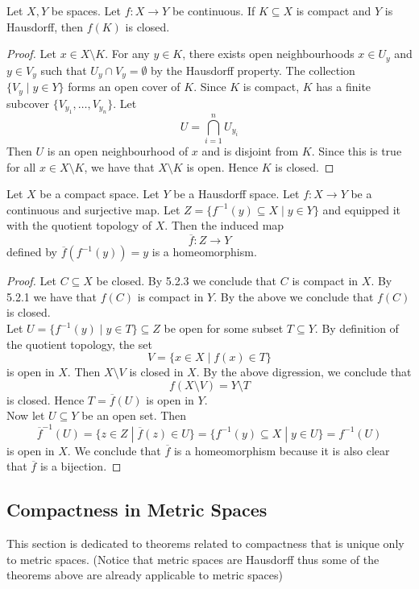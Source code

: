 \documentclass[a4paper]{article}
\begin{document}
\begin{prp}{}{} Let $X,Y$ be spaces. Let $f:X\to Y$ be continuous. If $K\subseteq X$ is compact and $Y$ is Hausdorff, then $f(K)$ is closed. 
\begin{proof}
Let $x\in X\setminus K$. For any $y\in K$, there exists open neighbourhoods $x\in U_y$ and $y\in V_y$ such that $U_y\cap V_y=\emptyset$ by the Hausdorff property. The collection $\{V_y\;|\;y\in Y\}$ forms an open cover of $K$. Since $K$ is compact, $K$ has a finite subcover $\{V_{y_1},\dots,V_{y_n}\}$. Let $$U=\bigcap_{i=1}^nU_{y_i}$$ Then $U$ is an open neighbourhood of $x$ and is disjoint from $K$. Since this is true for all $x\in X\setminus K$, we have that $X\setminus K$ is open. Hence $K$ is closed. 
\end{proof}
\end{prp}

\begin{prp}{}{} Let $X$ be a compact space. Let $Y$ be a Hausdorff space. Let $f:X\to Y$ be a continuous and surjective map. Let $Z=\{f^{-1}(y)\subseteq X\;|\;y\in Y\}$ and equipped it with the quotient topology of $X$. Then the induced map $$\overline{f}:Z\to Y$$ defined by $\overline{f}(f^{-1}(y))=y$ is a homeomorphism. 
\begin{proof}
Let $C\subseteq X$ be closed. By 5.2.3 we conclude that $C$ is compact in $X$. By 5.2.1 we have that $f(C)$ is compact in $Y$. By the above we conclude that $f(C)$ is closed. \\

Let $U=\{f^{-1}(y)\;|\; y\in T\}\subseteq Z$ be open for some subset $T\subseteq Y$. By definition of the quotient topology, the set $$V=\{x\in X\;|\;f(x)\in T\}$$ is open in $X$. Then $X\setminus V$ is closed in $X$. By the above digression, we conclude that $$f(X\setminus V)=Y\setminus T$$ is closed. Hence $T=\overline{f}(U)$ is open in $Y$. \\

Now let $U\subseteq Y$ be an open set. Then $$\overline{f}^{-1}(U)=\{z\in Z\;|\;\overline{f}(z)\in U\}=\{f^{-1}(y)\subseteq X\;|\;y\in U\}=f^{-1}(U)$$ is open in $X$. We conclude that $\overline{f}$ is a homeomorphism because it is also clear that $\overline{f}$ is a bijection. 
\end{proof}
\end{prp}

\subsection{Compactness in Metric Spaces}
This section is dedicated to theorems related to compactness that is unique only to metric spaces. (Notice that metric spaces are Hausdorff thus some of the theorems above are already applicable to metric spaces)
\end{document}
